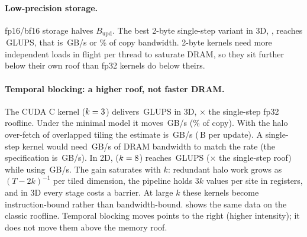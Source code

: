 \documentclass[11pt]{article}
\newcommand{\GLUPS}{\,GLUPS}
\newcommand{\code}[1]{\texttt{#1}}
\begin{document}
\paragraph{Low-precision storage.}
fp16/bf16 storage halves $B_{\text{upd}}$. The best 2-byte single-step variant in 3D,
\code{\bestLowThreeDVariant}, reaches \bestLowThreeDGLUPS\GLUPS{}, that is
\bestLowThreeDBW\,GB/s or \bestLowThreeDPctCopy\% of copy bandwidth. 2-byte kernels need more
independent loads in flight per thread to saturate DRAM, so they sit further below their own
roof than fp32 kernels do below theirs.

\paragraph{Temporal blocking: a higher roof, not faster DRAM.}
The CUDA C kernel \code{\bestTBThreeDVariant} ($k=3$) delivers
\bestTBThreeDGLUPS\GLUPS{} in 3D, \bestTBThreeDOverRoof$\times$ the single-step fp32 roofline.
Under the minimal model it moves \bestTBThreeDBW\,GB/s (\bestTBThreeDPctCopy\% of copy). With the
halo over-fetch of overlapped tiling the estimate is \bestTBThreeDHaloBW\,GB/s
(\bestTBThreeDHaloBytes\,B per update). A single-step kernel would need
\bestTBThreeDEquiv\,GB/s of DRAM bandwidth to match the rate (the specification is
\specBW\,GB/s). In 2D,
\code{\bestTBTwoDVariant} ($k=8$) reaches \bestTBTwoDGLUPS\GLUPS{}
(\bestTBTwoDOverRoof$\times$ the single-step roof) while using \bestTBTwoDBW\,GB/s. The gain
saturates with $k$: redundant halo work grows as $(T-2k)^{-1}$ per tiled dimension, the
pipeline holds $3k$ values per site in registers, and in 3D every stage costs a barrier. At
large $k$ these kernels become instruction-bound rather than bandwidth-bound.
 shows the same data on the classic roofline. Temporal blocking
moves points to the right (higher intensity); it does not move them above the memory roof.

\ifdefined\cpMode
\end{document}
